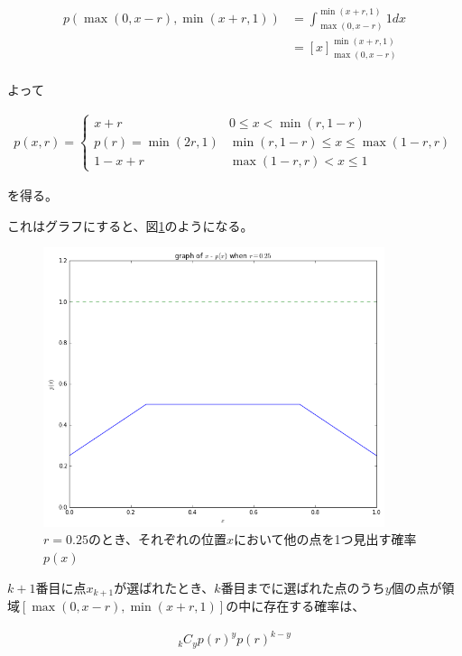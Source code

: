 \begin{align}
p(\max(0, x-r), \min(x+r, 1)) &= \int ^{\min(x+r,1)}_{\max(0, x-r)} 1 dx \\
&= \left[ x\right]^{\min(x+r,1)}_{\max(0, x-r)}\\
\end{align}

よって

\begin{eqnarray}
p(x,r)= \left\{ \begin{array}{ll}x+r & 0\le x< \min(r,1-r) \\
p(r) = \min(2r, 1) & \min(r, 1-r)\le x \le \max(1-r, r) \\
1 - x+r & \max(1-r, r) < x \le 1
\end{array}\right.
\end{eqnarray}

を得る。

これはグラフにすると、図\ref{fig:f3}のようになる。

\begin{figure}[H]
    \begin{center}
        \includegraphics[width=10cm]{../img/fig3.png}
        \caption{$r=0.25$のとき、それぞれの位置$x$において他の点を1つ見出す確率$p(x)$}
        \label{fig:f3}
    \end{center}
\end{figure}

$k+1$番目に点$x_{k+1}$が選ばれたとき、$k$番目までに選ばれた点のうち$y$個の点が領域$[\max(0,x-r), \min(x+r,1)]$の中に存在する確率は、

\begin{eqnarray}
_{k}C_{y}p(r)^{y}p(r)^{k-y}
\label{eq:e1}
\end{eqnarray}


